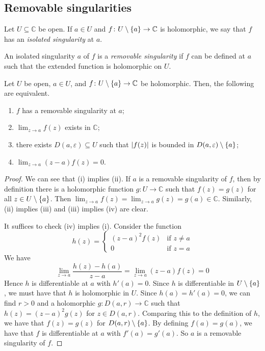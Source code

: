 \subsection{Removable singularities}
\begin{definition}
	Let \( U \subseteq \mathbb C \) be open.
	If \( a \in U \) and \( f \colon U \setminus \qty{a} \to \mathbb C \) is holomorphic, we say that \( f \) has an \textit{isolated singularity} at \( a \).
\end{definition}
\begin{definition}
	An isolated singularity \( a \) of \( f \) is a \textit{removable singularity} if \( f \) can be defined at \( a \) such that the extended function is holomorphic on \( U \).
\end{definition}
\begin{proposition}
	Let \( U \) be open, \( a \in U \), and \( f \colon U \setminus \qty{a} \to \mathbb C \) be holomorphic.
	Then, the following are equivalent.
	\begin{enumerate}
		\item \( f \) has a removable singularity at \( a \);
		\item \( \lim_{z \to a} f(z) \) exists in \( \mathbb C \);
		\item there exists \( D(a,\varepsilon) \subseteq U \) such that \( \abs{f(z)} \) is bounded in \( D(a,\varepsilon) \setminus \qty{a} \);
		\item \( \lim_{z \to a} (z-a) f(z) = 0 \).
	\end{enumerate}
\end{proposition}
\begin{proof}
	We can see that (i) implies (ii).
	If \( a \) is a removable singularity of \( f \), then by definition there is a holomorphic function \( g \colon U \to \mathbb C \) such that \( f(z) = g(z) \) for all \( z \in U \setminus \qty{a} \).
	Then \( \lim_{z \to a} f(z) = \lim_{z \to a} g(z) = g(a) \in \mathbb C \).
	Similarly, (ii) implies (iii) and (iii) implies (iv) are clear.

	It suffices to check (iv) implies (i).
	Consider the function
	\[
		h(z) = \begin{cases}
			(z-a)^2 f(z) & \text{if } z \neq a \\
			0            & \text{if } z = a
		\end{cases}
	\]
	We have
	\[
		\lim_{z \to a} \frac{h(z) - h(a)}{z-a} = \lim_{z \to a} (z-a) f(z) = 0
	\]
	Hence \( h \) is differentiable at \( a \) with \( h'(a) = 0 \).
	Since \( h \) is differentiable in \( U \setminus \qty{a} \), we must have that \( h \) is holomorphic in \( U \).
	Since \( h(a) = h'(a) = 0 \), we can find \( r > 0 \) and a holomorphic \( g \colon D(a,r) \to \mathbb C \) such that \( h(z) = (z-a)^2 g(z) \) for \( z \in D(a,r) \).
	Comparing this to the definition of \( h \), we have that \( f(z) = g(z) \) for \( D(a,r) \setminus \qty{a} \).
	By defining \( f(a) = g(a) \), we have that \( f \) is differentiable at \( a \) with \( f'(a) = g'(a) \).
	So \( a \) is a removable singularity of \( f \).
\end{proof}
